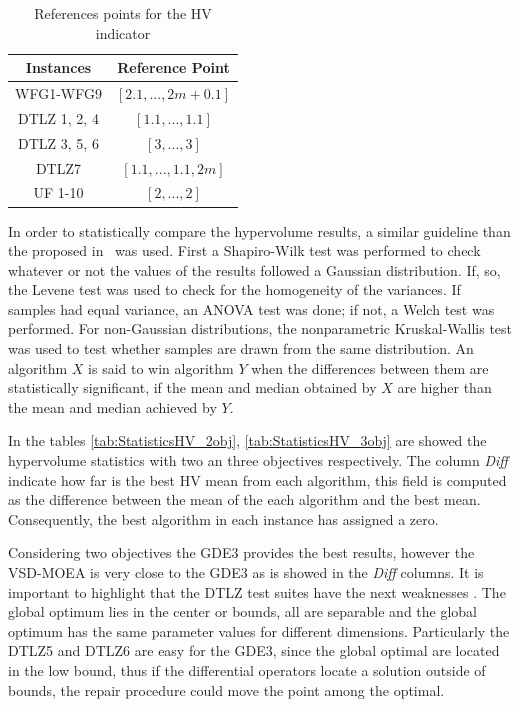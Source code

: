 \begin{table}[t]
\centering
\caption{References points for the HV indicator}
\label{tab:ReferencePoints}
\begin{tabular}{cc}
\hline
\textbf{Instances} & \textbf{Reference Point} \\ \hline
WFG1-WFG9 & $[2.1, ...,2m+0.1]$ \\
DTLZ 1, 2, 4 & $[1.1, ..., 1.1]$ \\
DTLZ 3, 5, 6 & $[3, ..., 3]$ \\
DTLZ7 & $[1.1, ..., 1.1, 2m]$ \\
UF 1-10 & $[2, ..., 2]$ \\ \hline
\end{tabular}
\end{table}
%
In order to statistically compare the hypervolume results, a similar guideline than the proposed in~\cite{Joel:StatisticalTest} was used. 
%
First a Shapiro-Wilk test was performed to check whatever or not the values of the results followed a Gaussian distribution. 
%
If, so, the Levene test was used to check for the homogeneity of the variances. 
%
If samples had equal variance, an ANOVA test was done; if not, a Welch test was performed. 
%
For non-Gaussian distributions, the nonparametric Kruskal-Wallis test was used to test whether samples are drawn from the same distribution. 
%
An algorithm $X$ is said to win algorithm $Y$ when the differences between them are statistically significant, if the mean and median obtained by $X$ are higher than the mean and median achieved by $Y$.

%

In the tables \ref{tab:StatisticsHV_2obj}, \ref{tab:StatisticsHV_3obj} are showed the hypervolume statistics with two an three objectives respectively.
%
The column \textit{Diff} indicate how far is the best HV mean from each algorithm, this field is computed as the difference between the mean of the each algorithm and the best mean.
%
Consequently, the best algorithm in each instance has assigned a zero.
%

Considering two objectives the GDE3 provides the best results, however the VSD-MOEA is very close to the GDE3 as is showed in the \textit{Diff} columns.
%
It is important to highlight that the DTLZ test suites have the next weaknesses \cite{Joel:CEC2009}.
The global optimum lies in the center or bounds, all are separable and the global optimum has the same parameter values for different dimensions.
%
Particularly the DTLZ5 and DTLZ6 are easy for the GDE3, since the global optimal are located in the low bound, thus if the differential operators locate a solution outside of bounds, the repair procedure could move the point among the optimal.

